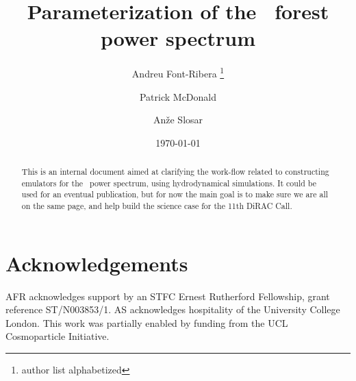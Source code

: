 \documentclass[preprintnumbers,prd,superscriptaddress,notitlepage,nofootinbib] {revtex4-1}
\begin{document}
\title{Parameterization of the \lya\ forest power spectrum}

\author{Andreu Font-Ribera \footnote{author list alphabetized}}
\author{Patrick McDonald}
\author{An\v{z}e Slosar}

\date{\today}

\begin{abstract}
This is an internal document aimed at clarifying the work-flow related to constructing emulators for the 
\lya\ power spectrum, using hydrodynamical simulations.
It could be used for an eventual publication, but for now the main goal is to make sure we are all on the
same page, and help build the science case for the 11th DiRAC Call.
\end{abstract}

\maketitle











%

%

%

\section*{Acknowledgements}
AFR acknowledges support by an STFC Ernest Rutherford Fellowship, grant reference ST/N003853/1.
AS acknowledges hospitality of the University College London.
This work was partially enabled by funding from the UCL Cosmoparticle
Initiative.




\appendix


\end{document}
